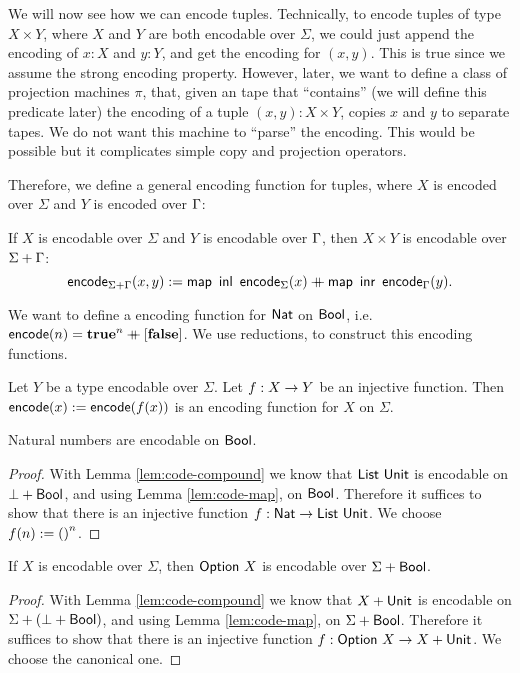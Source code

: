 \documentclass{psartcl}
\begin{document}
We will now see how we can encode tuples.
Technically, to encode tuples of type $X \times Y$, where $X$ and $Y$ are both encodable over $\Sigma$, we could just append the encoding of $x:X$
and $y:Y$, and get the encoding for $(x, y)$.
This is true since we assume the strong encoding property.
However, later, we want to define a class of projection machines $\pi$, that, given an tape that ``contains'' (we will define this predicate later)
the encoding of a tuple $(x,y) : X \times Y$, copies $x$ and $y$ to separate tapes.
We do not want this machine to ``parse'' the encoding.  This would be possible but it complicates simple copy and projection operators.

Therefore, we define a general encoding function for tuples, where $X$ is encoded over $\Sigma$ and $Y$ is encoded over $\Gamma$:
\begin{lemma}
  If $X$ is encodable over $\Sigma$ and $Y$ is encodable over $\Gamma$, then $X \times Y$ is encodable over $\Sigma + \Gamma$:
  $$\textsf{encode}_{\Sigma+\Gamma}(x,y) := \textsf{map}~\operatorname{\textsf{inl}}~\textsf{encode}_{\Sigma}(x) \mathbin{+\mkern-10mu+} \textsf{map}~\operatorname{\textsf{inr}}~\textsf{encode}_{\Gamma}(y).$$
\end{lemma}


We want to define a encoding function for $\textsf{Nat}$ on $\textsf{Bool}$, i.e. $\textsf{encode}(n)=\mathbf{true}^n \mathbin{+\mkern-10mu+} [\mathbf{false}]$.
We use reductions, to construct this encoding functions.

\begin{lemma}
  \label{lem:code-reduce}
  Let $Y$ be a type encodable over $\Sigma$.
  Let $f : X \rightarrow Y$ be an injective function.
  Then $\textsf{encode}(x) := \textsf{encode}(f(x))$ is an encoding function for $X$ on $\Sigma$.
\end{lemma}

\begin{corollary}
  \label{lem:code-nat}
  Natural numbers are encodable on $\textsf{Bool}$.
\end{corollary}
\begin{proof}
  With Lemma \ref{lem:code-compound} we know that $\textsf{List}~\textsf{Unit}$ is encodable on $\bot + \textsf{Bool}$, and using Lemma \ref{lem:code-map}, on $\textsf{Bool}$.
  Therefore it suffices to show that there is an injective function $f : \textsf{Nat} \rightarrow \textsf{List}~\textsf{Unit}$.
  We choose $f(n) := \mathbf{()}^n$.
\end{proof}

\begin{corollary}
  \label{lem:code-option}
  If $X$ is encodable over $\Sigma$, then
  $\textsf{Option}~X$ is encodable over $\Sigma + \textsf{Bool}$.
\end{corollary}
\begin{proof}
  With Lemma \ref{lem:code-compound} we know that $X + \textsf{Unit}$ is encodable on $\Sigma + (\bot + \textsf{Bool})$, and using Lemma \ref{lem:code-map}, on
  $\Sigma + \textsf{Bool}$.  Therefore it suffices to show that there is an injective function $f : \textsf{Option}~X \rightarrow X + \textsf{Unit}$.
  We choose the canonical one.
\end{proof}
\end{document}
